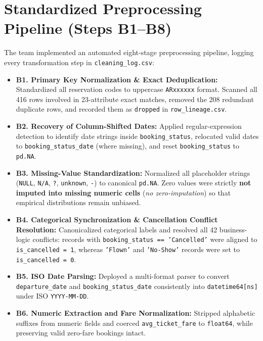 \documentclass[12pt, a4paper]{report}
\newcommand{\code}[1]{\texttt{\small\color{DarkSlate}#1}}
\begin{document}
\section{Standardized Preprocessing Pipeline (Steps B1--B8)}

The team implemented an automated eight-stage preprocessing pipeline, logging every transformation step in \code{cleaning\_log.csv}:

\begin{itemize}
  \item \textbf{B1. Primary Key Normalization \& Exact Deduplication:} Standardized all reservation codes to uppercase \code{ARxxxxxx} format. Scanned all 416 rows involved in 23-attribute exact matches, removed the 208 redundant duplicate rows, and recorded them as \code{dropped} in \code{row\_lineage.csv}.

  \item \textbf{B2. Recovery of Column-Shifted Dates:} Applied regular-expression detection to identify date strings inside \code{booking\_status}, relocated valid dates to \code{booking\_status\_date} (where missing), and reset \code{booking\_status} to \code{pd.NA}.

  \item \textbf{B3. Missing-Value Standardization:} Normalized all placeholder strings (\code{NULL}, \code{N/A}, \code{?}, \code{unknown}, \code{-}) to canonical \code{pd.NA}. Zero values were strictly \textbf{not imputed into missing numeric cells} (\textit{no zero-imputation}) so that empirical distributions remain unbiased.

  \item \textbf{B4. Categorical Synchronization \& Cancellation Conflict Resolution:} Canonicalized categorical labels and resolved all 42 business-logic conflicts: records with \code{booking\_status == 'Cancelled'} were aligned to \code{is\_cancelled = 1}, whereas \code{'Flown'} and \code{'No-Show'} records were set to \code{is\_cancelled = 0}.

  \item \textbf{B5. ISO Date Parsing:} Deployed a multi-format parser to convert \code{departure\_date} and \code{booking\_status\_date} consistently into \texttt{datetime64[ns]} under ISO \code{YYYY-MM-DD}.

  \item \textbf{B6. Numeric Extraction and Fare Normalization:} Stripped alphabetic suffixes from numeric fields and coerced \code{avg\_ticket\_fare} to \texttt{float64}, while preserving valid zero-fare bookings intact.


\end{itemize}
\end{document}
